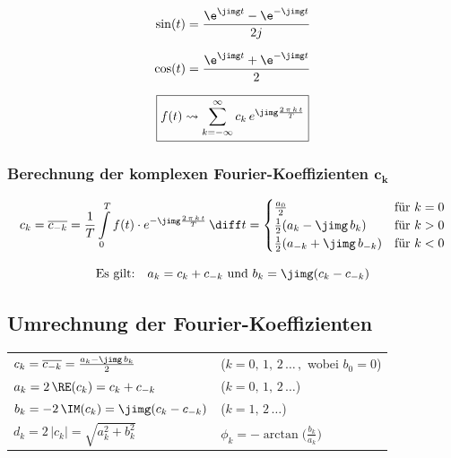 \begin{minipage}{0.48\columnwidth}
    $$ \sin(t) = \frac{\e^{\jimg t} - \e^{- \jimg t}}{2j} $$ 
\end{minipage}
\hfill
\begin{minipage}{0.48\columnwidth}
    $$ \cos(t) = \frac{\e^{\jimg t} + \e^{- \jimg t}}{2} $$
\end{minipage}

\vspace{0.2cm}

$$  \boxed{ f(t) \rightsquigarrow \sum\limits_{k=-\infty}^\infty c_k \, e^{\jimg \frac{2 \, \pi \, k \, t}{T}} } $$


\subsubsection{Berechnung der komplexen Fourier-Koeffizienten $\bm{c_k}$}

\vspace{-0.2cm}

$$c_k = \overline{c_{-k}} = \frac{1}{T} \int\limits_0^T f(t) \cdot e^{- \jimg \frac{2 \, \pi \, k \, t}{T}}   \, \diff t =
\begin{cases}
\frac{a_0}{2}                       & \text{für } k = 0 \\
\frac{1}{2} (a_k - \jimg \, b_k)        & \text{für } k > 0 \\
\frac{1}{2} (a_{-k} + \jimg \, b_{-k})  & \text{für } k < 0
\end{cases} $$

$$ \text{Es gilt:} \quad a_k = c_k + c_{-k} \text{ und } b_k = \jimg (c_k - c_{-k}) $$ 

		
\subsection{Umrechnung der Fourier-Koeffizienten}

\renewcommand{\arraystretch}{1.5}
\begin{tabular}{ll}
    $c_k = \overline{c_{-k}} = \frac{a_k - \jimg \, b_k }{2}$   & ($k = 0, \, 1, \,  2\, \ldots \, ,$ wobei $b_0 = 0$)  \\
    $a_k = 2 \, \RE(c_k) = c_k + c_{-k}$                        & ($k = 0, \, 1, \,  2\, \ldots$)                       \\
    $b_k = -2 \, \IM(c_k) = \jimg(c_k - c_{-k})$                & ($k = 1, \,  2\, \ldots$)                             \\
    $d_k = 2 \, |c_k| = \sqrt{a_k^2 + b_k^2}$                   & $\phi_k = - \arctan \Big( \frac{b_k}{a_k} \Big)$
\end{tabular}
\renewcommand{\arraystretch}{1}
		
